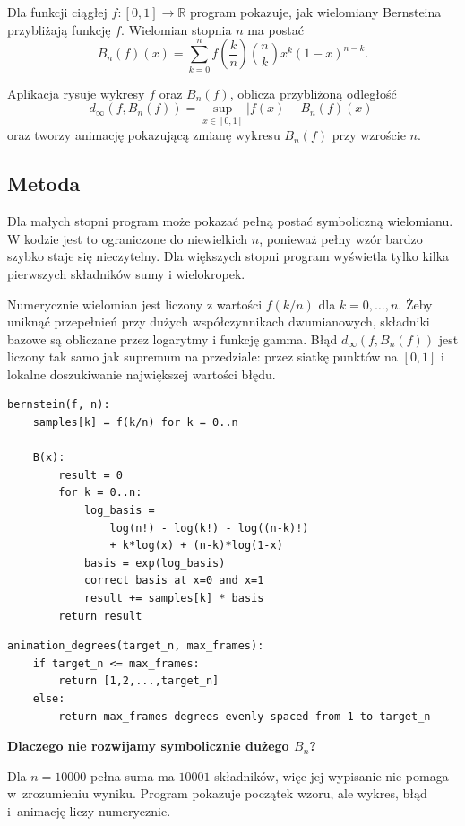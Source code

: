\documentclass[12pt,a4paper]{article}
\newcommand{\plainnote}[2]{%
\par\medskip
\noindent\begin{minipage}{0.94\linewidth}
\textbf{#1}\par\smallskip
#2
\end{minipage}
\par\medskip
}
\newcommand{\techbox}[2]{\plainnote{#1}{#2}}
\begin{document}
Dla funkcji ciągłej $f:[0,1]\to\mathbb{R}$ program pokazuje, jak wielomiany Bernsteina przybliżają funkcję $f$. Wielomian stopnia $n$ ma postać
\[
B_n(f)(x)=\sum_{k=0}^{n} f\left(\frac{k}{n}\right)
\binom{n}{k}x^k(1-x)^{n-k}.
\]

Aplikacja rysuje wykresy $f$ oraz $B_n(f)$, oblicza przybliżoną odległość
\[
d_\infty(f,B_n(f))=\sup_{x\in[0,1]}|f(x)-B_n(f)(x)|
\]
oraz tworzy animację pokazującą zmianę wykresu $B_n(f)$ przy wzroście $n$.

\subsection{Metoda}

Dla małych stopni program może pokazać pełną postać symboliczną wielomianu. W kodzie jest to ograniczone do niewielkich $n$, ponieważ pełny wzór bardzo szybko staje się nieczytelny. Dla większych stopni program wyświetla tylko kilka pierwszych składników sumy i wielokropek.

Numerycznie wielomian jest liczony z wartości $f(k/n)$ dla $k=0,\ldots,n$. Żeby uniknąć przepełnień przy dużych współczynnikach dwumianowych, składniki bazowe są obliczane przez logarytmy i funkcję gamma. Błąd $d_\infty(f,B_n(f))$ jest liczony tak samo jak supremum na przedziale: przez siatkę punktów na $[0,1]$ i lokalne doszukiwanie największej wartości błędu.

\begin{lstlisting}[style=pseudo,caption={Numeryczna ewaluacja wielomianu Bernsteina}]
bernstein(f, n):
    samples[k] = f(k/n) for k = 0..n

    B(x):
        result = 0
        for k = 0..n:
            log_basis =
                log(n!) - log(k!) - log((n-k)!)
                + k*log(x) + (n-k)*log(1-x)
            basis = exp(log_basis)
            correct basis at x=0 and x=1
            result += samples[k] * basis
        return result
\end{lstlisting}

\begin{lstlisting}[style=pseudo,caption={Animacja Bernsteina dla dużego n}]
animation_degrees(target_n, max_frames):
    if target_n <= max_frames:
        return [1,2,...,target_n]
    else:
        return max_frames degrees evenly spaced from 1 to target_n
\end{lstlisting}

\techbox{Dlaczego nie rozwijamy symbolicznie dużego $B_n$?}{
Dla $n=10000$ pełna suma ma $10001$ składników, więc jej wypisanie nie pomaga w~zrozumieniu wyniku. Program pokazuje początek wzoru, ale wykres, błąd i~animację liczy numerycznie.
}
\end{document}
